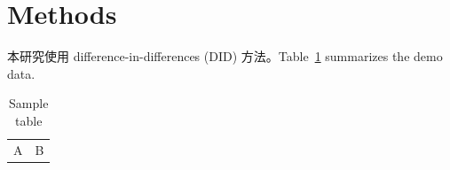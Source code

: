 \section{Methods}
本研究使用 difference-in-differences (DID) 方法。Table~\ref{tab:sample} summarizes the demo data.

\begin{table}
	\caption{Sample table}
	\label{tab:sample}
	\begin{tabular}{cc}
		A & B \\
	\end{tabular}
\end{table}
